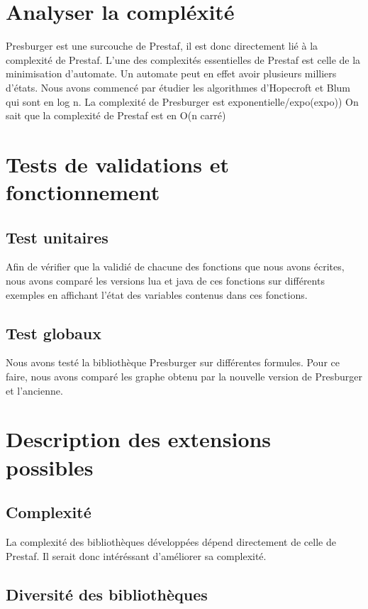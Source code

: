 \documentclass{article}%
\begin{document}
\section{Analyser la compléxité}

Presburger est une surcouche de Prestaf, il est donc directement lié à la complexité de Prestaf. L'une des complexités essentielles de Prestaf est celle de la minimisation d'automate. Un automate peut en effet avoir plusieurs milliers d'états. Nous avons commencé par étudier les algorithmes d'Hopecroft et Blum qui sont en log n. La complexité de Presburger est exponentielle/expo(expo))  On sait que la complexité de Prestaf est en O(n carré)

\section{Tests de validations et fonctionnement}

\subsection{Test unitaires}

Afin de vérifier que la validié de chacune des fonctions que nous avons écrites, nous avons comparé les versions lua et java de ces fonctions sur différents exemples en affichant l'état des variables contenus dans ces fonctions.

\subsection{Test globaux}

Nous avons testé la bibliothèque Presburger sur différentes formules. Pour ce faire, nous avons comparé les graphe obtenu par la nouvelle version de Presburger et l'ancienne.

\section{Description des extensions possibles}

\subsection{Complexité}

La complexité des bibliothèques développées dépend directement de celle de Prestaf. Il serait donc intéréssant d'améliorer sa complexité.

\subsection{Diversité des bibliothèques}
\end{document}
